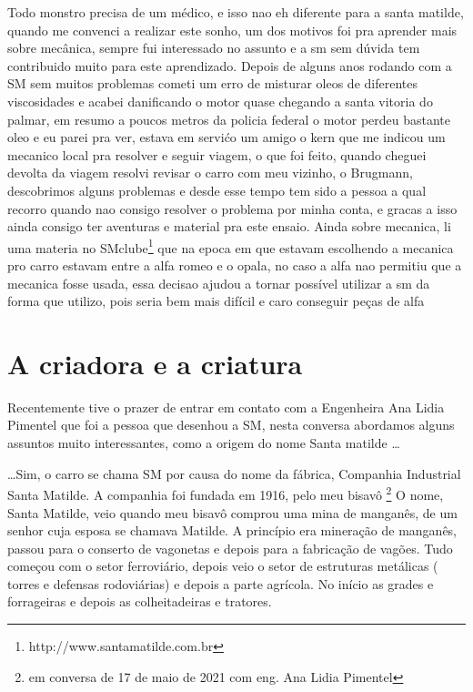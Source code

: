\documentclass[a4paper]{report}
\begin{document}
Todo monstro precisa de um m\'edico, e isso nao eh diferente para a santa matilde, quando me convenci a realizar este sonho, um dos motivos foi pra
aprender mais sobre mec\^anica, sempre fui interessado no assunto e a sm sem d\'uvida tem contribuido muito para este aprendizado.
Depois de alguns anos rodando com a SM sem muitos problemas cometi um erro de misturar oleos de diferentes viscosidades e acabei danificando o motor quase chegando a santa vitoria do palmar, em resumo a poucos metros da policia federal o motor perdeu bastante oleo e eu parei pra ver, estava em servi\'co um amigo o kern que me indicou um mecanico local pra resolver e seguir viagem, o que foi feito, quando cheguei devolta da viagem resolvi revisar o carro com meu vizinho, o Brugmann, descobrimos alguns problemas e desde esse tempo tem sido a pessoa a qual recorro quando nao consigo resolver o problema por minha conta, e gracas a isso ainda consigo ter aventuras e material pra este ensaio.
Ainda sobre mecanica, li uma materia no SMclube\footnote{http://www.santamatilde.com.br} que na epoca em que estavam escolhendo a mecanica pro carro estavam entre a alfa romeo e o opala, no caso a alfa nao permitiu que a mecanica fosse usada,  essa decisao ajudou a tornar poss\'ivel  utilizar a sm da forma que utilizo, pois seria bem mais dif\'icil e caro conseguir pe\c{c}as de alfa


\section*{A criadora e a criatura}

Recentemente tive o prazer de entrar em contato com a Engenheira Ana Lidia Pimentel que foi a pessoa que desenhou a SM, nesta conversa abordamos alguns
assuntos muito interessantes, como a origem do nome Santa matilde \dots

\dots Sim, o carro se chama SM por causa do nome da f\'abrica, Companhia Industrial Santa Matilde. A companhia foi fundada em 1916, pelo meu bisav\^o \footnote{ em conversa de 17 de maio de 2021 com eng. Ana Lidia Pimentel }
O nome, Santa Matilde, veio quando meu bisav\^o comprou uma mina de mangan\^es, de um senhor cuja esposa se chamava Matilde.
A princ\'ipio era minera\c{c}\~ao de mangan\^es, passou para o conserto de vagonetas e depois para a fabrica\c{c}\~ao de vag\~oes.
Tudo come\c{c}ou com o setor ferrovi\'ario, depois veio o setor de estruturas met\'alicas ( torres e defensas rodovi\'arias) e depois a parte agr\'icola. No in\'icio as grades e forrageiras e depois as colheitadeiras e tratores. 
\end{document}
